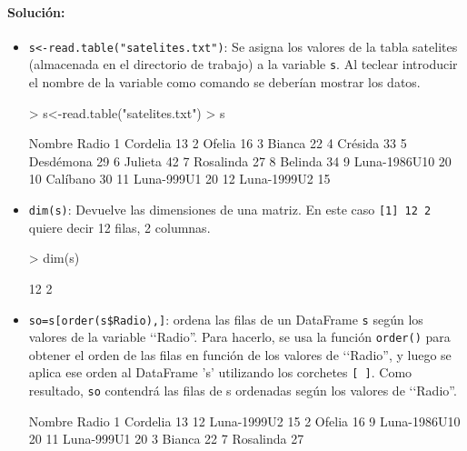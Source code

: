 \documentclass[a4paper, 12pt]{article}
\begin{document}
	\paragraph{Solución:}
	\begin{itemize}
		\item \texttt{s<-read.table(\string"satelites.txt")}: Se asigna los valores de la tabla satelites (almacenada en el directorio de trabajo) a la variable \texttt{s}. Al teclear introducir el nombre de la variable como comando se deberían mostrar los datos.
\begin{Schunk}
\begin{Sinput}
> s<-read.table("satelites.txt")
> s
\end{Sinput}
\begin{Soutput}
         Nombre Radio
1      Cordelia    13
2        Ofelia    16
3        Bianca    22
4       Crésida    33
5     Desdémona    29
6       Julieta    42
7     Rosalinda    27
8       Belinda    34
9  Luna-1986U10    20
10     Calíbano    30
11   Luna-999U1    20
12  Luna-1999U2    15
\end{Soutput}
\end{Schunk}
		\item \texttt{dim(s)}: Devuelve las dimensiones de una matriz. En este caso \texttt{[1] 12 2} quiere decir 12 filas, 2 columnas.
\begin{Schunk}
\begin{Sinput}
> dim(s)
\end{Sinput}
\begin{Soutput}
[1] 12  2
\end{Soutput}
\end{Schunk}
		\item \texttt{so=s[order(s\$Radio),]}: ordena las filas de un DataFrame \texttt{s} según los valores de la variable ‘‘Radio''. Para hacerlo, se usa la función \texttt{order()} para obtener el orden de las filas en función de los valores de ‘‘Radio'', y luego se aplica ese orden al DataFrame 's' utilizando los corchetes \texttt{[ ]}. Como resultado, \texttt{so} contendrá las filas de s ordenadas según los valores de ‘‘Radio''.
\begin{Schunk}
\begin{Soutput}
         Nombre Radio
1      Cordelia    13
12  Luna-1999U2    15
2        Ofelia    16
9  Luna-1986U10    20
11   Luna-999U1    20
3        Bianca    22
7     Rosalinda    27

\end{Soutput}
\end{Schunk}
\end{itemize}
\end{document}
